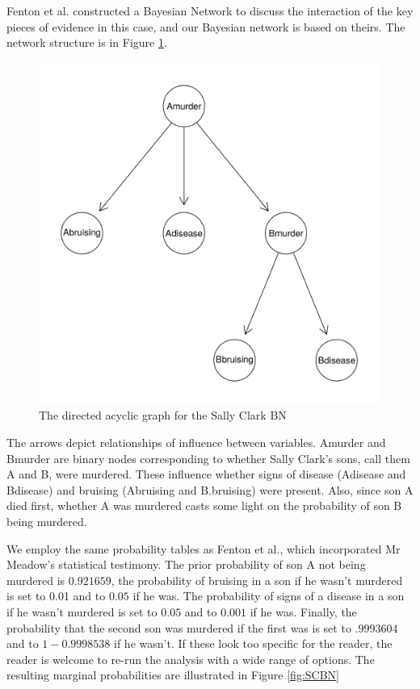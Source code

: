 \documentclass[10pt,]{scrartcl}
\begin{document}
 Fenton et al. constructed a Bayesian Network to discuss the interaction of the key pieces of evidence in this case, and our Bayesian network is based on theirs.  The network structure is in Figure \ref{fig:sc}.


\begin{figure}[H]
    \centering
    \includegraphics{SC.png}
    \caption{The directed acyclic graph for the Sally Clark BN}
    \label{fig:sc}
\end{figure}



The  arrows  depict  relationships  of  influence  between  variables. \textsf{Amurder} and \textsf{Bmurder} are binary nodes corresponding to whether Sally  Clark’s  sons,   call  them A and B, were murdered. These  influence  whether  signs of disease (\textsf{Adisease} and \textsf{Bdisease}) and bruising (\textsf{Abruising} and \textsf{B.bruising}) were present. Also, since  son A died first, whether A was murdered casts some light on the probability of son B being murdered.

We employ the same probability tables as Fenton et al., which incorporated Mr Meadow's statistical testimony. The prior probability of son A not being murdered is $0.921659$, the probability of bruising in a son if he wasn't murdered is set to 0.01 and to $0.05$ if he was. The probability of signs of a disease in a son if he wasn't murdered is set to $0.05$ and to $0.001$ if he was. Finally, the probability that the second son was murdered if the first was is set to $.9993604$ and to $1-0.9998538$ if he wasn't. If these look too specific for the reader, the reader is welcome to re-run the analysis with a wide range of options. The resulting marginal probabilities are illustrated in Figure \ref{fig:SCBN}
\end{document}
